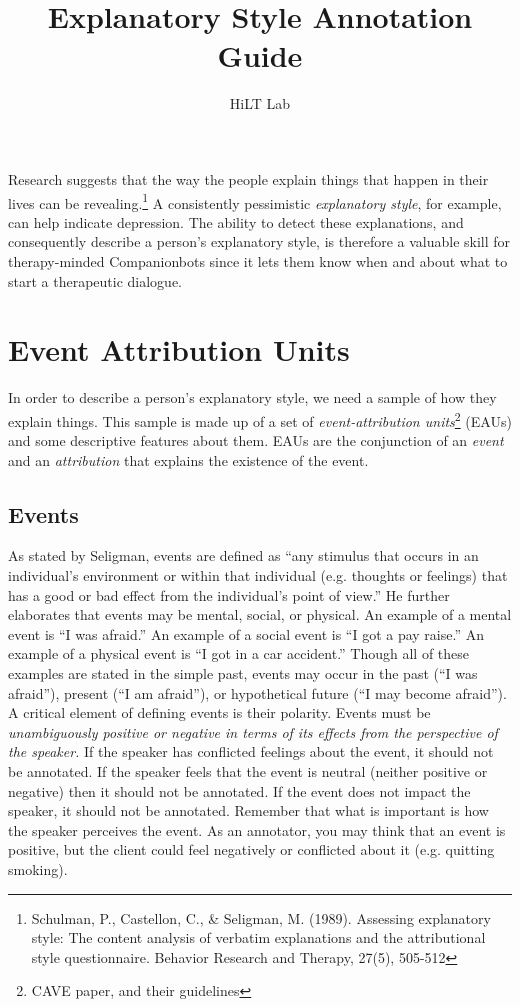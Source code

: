 \documentclass[a4paper,12pt]{article}
\begin{document}
\title{Explanatory Style Annotation Guide}
\author{HiLT Lab}
\maketitle


Research suggests that the way the people explain things that happen in their lives can be revealing.\footnote{\label{seligman89}Schulman, P., Castellon, C., \& Seligman, M. (1989). Assessing explanatory style: The content analysis of verbatim explanations and the attributional style questionnaire. Behavior Research and Therapy, 27(5), 505-512} %
A consistently pessimistic \emph{explanatory style}, for example, can help indicate depression.
The ability to detect these explanations, and consequently describe a person's explanatory style, is therefore a valuable skill for therapy-minded Companionbots since it lets them know when and about what to start a therapeutic dialogue.

\section{Event Attribution Units}
In order to describe a person's explanatory style, we need a sample of how they explain things. %
This sample is made up of a set of \emph{event-attribution units}\footnote{\label{CAVE}CAVE paper, and their guidelines} (EAUs) and some descriptive features about them.
EAUs are the conjunction of an \emph{event} and an \emph{attribution} that explains the existence of the event.
 

\subsection{Events}
As stated by Seligman, events are defined as “any stimulus that occurs in an individual’s environment or
within that individual (e.g. thoughts or feelings) that has a good or bad effect from the individual’s point of
view.” He further elaborates that events may be mental, social, or physical. An example of a mental event is
“I was afraid.” An example of a social event is “I got a pay raise.” An example of a physical event is “I got in a
car accident.” Though all of these examples are stated in the simple past, events may occur in the past (“I
was afraid”), present (“I am afraid”), or hypothetical future (“I may become afraid”).
A critical element of defining events is their polarity. Events must be \emph{unambiguously positive or negative
in terms of its effects from the perspective of the speaker.} If the speaker has conflicted feelings about
the event, it should not be annotated. If the speaker feels that the event is neutral (neither positive or
negative) then it should not be annotated. If the event does not impact the speaker, it should not be
annotated. Remember that what is important is how the speaker perceives the event. As an annotator, you
may think that an event is positive, but the client could feel negatively or conflicted about it (e.g. quitting
smoking).
\end{document}
